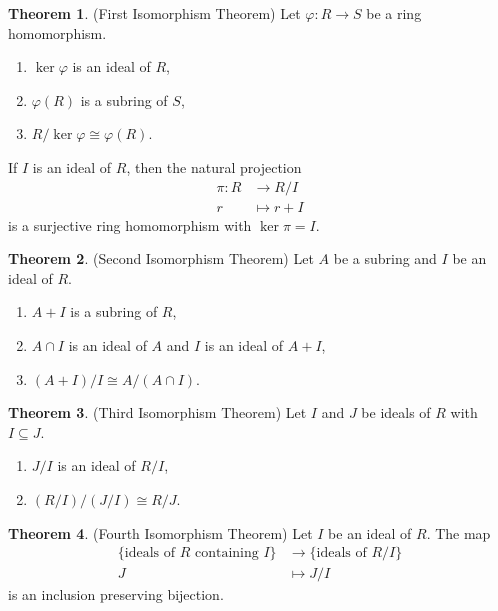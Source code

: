 \documentclass[12pt]{article}
\theoremstyle{definition}
\newtheorem{theorem}{Theorem}
\renewcommand{\phi}{\varphi}
\newcommand{\<}{\left\langle}
\renewcommand{\>}{\right\rangle}
\newcommand{\isom}{\cong}
\newcommand{\seq}{\subseteq}
\begin{document}
\newpage


\begin{theorem}(First Isomorphism Theorem)
    Let $\phi : R \to S$ be a ring homomorphism.
    \begin{enumerate}
        \item $\ker \phi$ is an ideal of $R$,
        \item $\phi(R)$ is a subring of $S$,
        \item $R/\ker\phi \isom \phi(R)$.
    \end{enumerate}
    
    
    If $I$ is an ideal of $R$, then the natural projection
    \begin{align*}
        \pi : R &\to R/I \\
            r &\mapsto r + I
    \end{align*}
    is a surjective ring homomorphism with $\ker\pi = I$.
\end{theorem}

\begin{theorem}(Second Isomorphism Theorem)
    Let $A$ be a subring and $I$ be an ideal of $R$.
    \begin{enumerate}
        \item $A + I$ is a subring of $R$,
        \item $A \cap I$ is an ideal of $A$ and $I$ is an ideal of $A + I$,
        \item $(A + I)/I \isom A/(A \cap I)$.
    \end{enumerate}
\end{theorem}

\begin{theorem}(Third Isomorphism Theorem)
    Let $I$ and $J$ be ideals of $R$ with $I \seq J$.
    \begin{enumerate}
        \item $J/I$ is an ideal of $R/I$,
        \item $(R/I)/(J/I) \isom R/J$.
    \end{enumerate}
\end{theorem}

\begin{theorem}(Fourth Isomorphism Theorem)
    Let $I$ be an ideal of $R$. The map
    \begin{align*}
        \{\text{ideals of $R$ containing $I$}\} &\to \{\text{ideals of $R/I$}\} \\
        J &\mapsto J/I
    \end{align*}
    is an inclusion preserving bijection.
\end{theorem}
\end{document}
